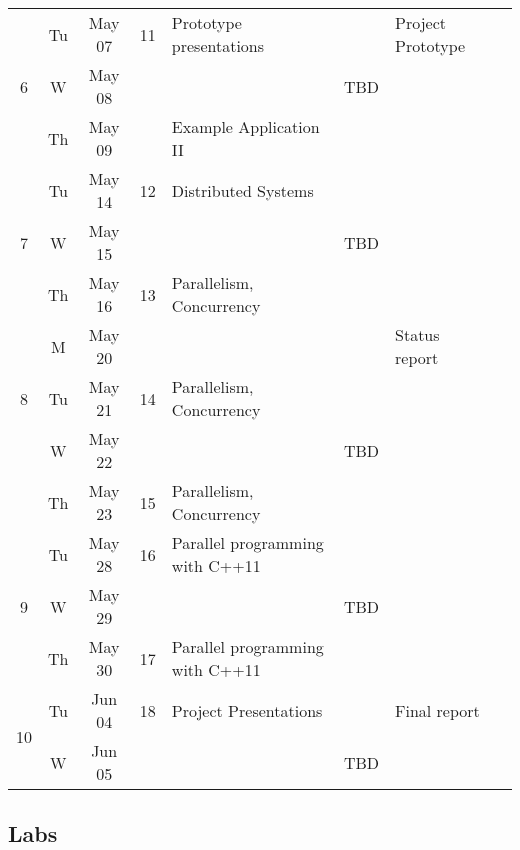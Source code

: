 \documentclass[11pt]{article}
\newcommand{\emptycell}{\cellcolor[gray]{0.9}}
\begin{document}
\begin{landscape}
\begin{longtable}{|c|cc|c|p{7cm}|p{6cm}|p{2cm}|c|}
\multirow{3}{*}{6} 	& Tu & May 07 	& 11 		& Prototype presentations	& \emptycell  	& Project \mbox{Prototype}\\ \cline{ 2- 8}
			& W & May 08	& \emptycell 	& \emptycell			& TBD	 	& \emptycell \\ \cline{ 2- 8}
			& Th & May 09 	& \emptycell	& Example Application II  	& \emptycell    & \emptycell \\ \hline\hline

\multirow{3}{*}{7} 	& Tu & May 14 	& 12 		& Distributed Systems		& \emptycell  	& \emptycell \\ \cline{ 2- 8}
			& W & May 15	& \emptycell 	& \emptycell			& TBD	 	& \emptycell \\ \cline{ 2- 8}
			& Th & May 16 	& 13 		& Parallelism, Concurrency 	& \emptycell  	& \emptycell \\ \hline\hline

\multirow{3}{*}{8}	& M & May 20 	& \emptycell	& \emptycell    		& \emptycell  	& Status report \\ \cline{ 2- 8}
			& Tu & May 21 	& 14 		& Parallelism, Concurrency	& \emptycell  	& \emptycell \\ \cline{ 2- 8}
			& W & May 22	& \emptycell 	& \emptycell			& TBD	 	& \emptycell \\ \cline{ 2- 8}
			& Th & May 23 	& 15 		& Parallelism, Concurrency 	& \emptycell  	& \emptycell \\ \hline\hline

\multirow{3}{*}{9} 	& Tu & May 28 	& 16 		& Parallel programming with C++11		& \emptycell &  \emptycell  	 \\ \cline{ 2- 8}
			& W & May 29	& \emptycell 	& \emptycell			& TBD	 	& \emptycell \\ \cline{ 2- 8}
			& Th & May 30 	& 17 		& Parallel programming with C++11	 	& \emptycell  	& \emptycell \\ \hline\hline

\multirow{3}{*}{10} 	& Tu & Jun 04 	& 18 		& Project Presentations		& \emptycell  	& Final report \\ \cline{ 2- 8}
			& W & Jun 05	& \emptycell 	& \emptycell			& TBD	 	& \emptycell \\ \cline{ 2- 8}

\end{longtable}

\end{landscape}



\subsection{Labs}
\end{document}
